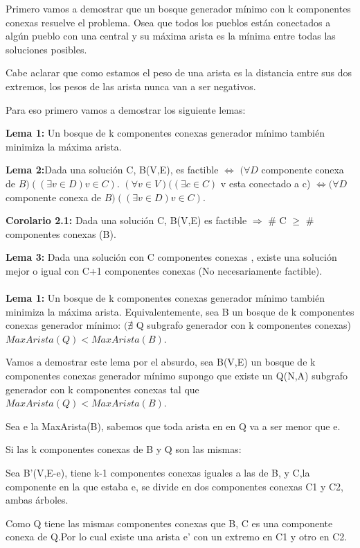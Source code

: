 Primero vamos a demostrar que un bosque generador mínimo con k componentes conexas resuelve el problema. Osea que todos los pueblos están conectados a algún pueblo con una central y su máxima arista es la mínima entre todas las soluciones posibles.

Cabe aclarar que como estamos el peso de una arista es la distancia entre sus dos extremos, los pesos de las arista nunca van a ser negativos.

Para eso primero vamos a demostrar los siguiente lemas:

\textbf{Lema 1:} Un bosque de k componentes conexas generador mínimo también minimiza la máxima arista.

\textbf{Lema 2:}Dada una solución C, B(V,E), es factible $\Longleftrightarrow$ $(\forall D$ componente conexa de $B)((\exists v \in D) v \in C)$.  $(\forall v \in V)((\exists c \in C)$ v esta conectado a c) $\Leftrightarrow (\forall D$ componente conexa de $B)((\exists v \in D) v \in C)$.

\textbf{Corolario 2.1:} Dada una solución C, B(V,E) es factible $\Rightarrow$ \# C $\geq$ \# componentes conexas (B).

\textbf{Lema 3:} Dada una solución con C componentes conexas , existe una solución mejor o igual con C+1 componentes conexas (No necesariamente factible). \\ \\ 


\textbf{Lema 1:} Un bosque de k componentes conexas generador mínimo también minimiza la máxima arista. Equivalentemente, sea B un bosque de k componentes conexas generador mínimo: $(\nexists$ Q subgrafo generador con k componentes conexas) $MaxArista(Q) < MaxArista(B)$.

Vamos a demostrar este lema por el absurdo, sea B(V,E) un bosque de k componentes conexas generador mínimo supongo que existe un Q(N,A) subgrafo generador con k componentes conexas tal que $MaxArista(Q) < MaxArista(B)$.

Sea e la MaxArista(B), sabemos que toda arista en en Q va a ser menor que e.

Si las k componentes conexas de B y Q son las mismas:

Sea B'(V,E-e), tiene k-1 componentes conexas iguales a las de B, y C,la componente en la que estaba e, se divide en dos componentes conexas C1 y C2, ambas árboles.

Como Q tiene las mismas componentes conexas que B, C es una componente conexa de Q.Por lo cual existe una arista e' con un extremo en C1 y otro en C2.

